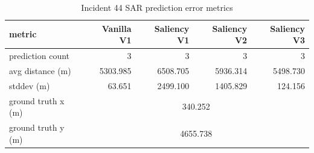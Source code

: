 \begin{table}[ht]
\centering
\caption{Incident 44 SAR prediction error metrics}
\label{tab:sar-incident-44}
\begin{tabular}{lrrrr}
\hline
metric & Vanilla V1 & Saliency V1 & Saliency V2 & Saliency V3 \\
\hline
prediction count & 3 & 3 & 3 & 3 \\
avg distance (m) & 5303.985 & 6508.705 & 5936.314 & 5498.730 \\
stddev (m) & 63.651 & 2499.100 & 1405.829 & 124.156 \\
ground truth x (m) & \multicolumn{4}{c}{340.252} \\
ground truth y (m) & \multicolumn{4}{c}{4655.738} \\
\hline
\end{tabular}
\end{table}
